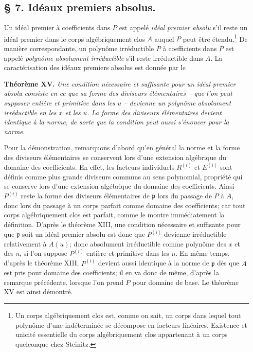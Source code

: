 \providecommand{\frakS}{\mathfrak S}
\providecommand{\frakm}{\mathfrak m}
\providecommand{\frakp}{\mathfrak p}

\subsection*{\S{} 7. Idéaux premiers absolus.}

Un idéal premier à coefficients dans $P$ est appelé \emph{idéal premier absolu} s'il reste un idéal premier dans le corps algébriquement clos $A$ auquel $P$ peut être étendu.\footnote{Un corps algébriquement clos est, comme on sait, un corps dans lequel tout polynôme d'une indéterminée se décompose en facteurs linéaires. Existence et unicité essentielle du corps algébriquement clos appartenant à un corps quelconque chez Steinitz.} De manière correspondante, un polynôme irréductible $P$ à coefficients dans $P$ est appelé \emph{polynôme absolument irréductible} s'il reste irréductible dans $A$. La caractérisation des idéaux premiers absolus est donnée par le

\textbf{Théorème XV.} \emph{Une condition nécessaire et suffisante pour un idéal premier absolu consiste en ce que sa forme des diviseurs élémentaires -- que l'on peut supposer entière et primitive dans les $u$ -- devienne un polynôme absolument irréductible en les $x$ et les $u$. La forme des diviseurs élémentaires devient identique à la norme, de sorte que la condition peut aussi s'énoncer pour la norme.}

Pour la démonstration, remarquons d'abord qu'en général la norme et la forme des diviseurs élémentaires se conservent lors d'une extension algébrique du domaine des coefficients. En effet, les facteurs individuels $R^{(i)}$ et $E^{(i)}$ sont définis comme plus grands diviseurs communs au sens polynomial, propriété qui se conserve lors d'une extension algébrique du domaine des coefficients. Ainsi $P^{(i)}$ reste la forme des diviseurs élémentaires de $\frakp$ lors du passage de $P$ à $A$, donc lors du passage à un corps parfait comme domaine des coefficients; car tout corps algébriquement clos est parfait, comme le montre immédiatement la définition. D'après le théorème XIII, une condition nécessaire et suffisante pour que $\frakp$ soit un idéal premier absolu est donc que $P^{(i)}$ devienne irréductible relativement à $A(u)$; donc absolument irréductible comme polynôme des $x$ et des $u$, si l'on suppose $P^{(i)}$ entière et primitive dans les $u$. En même temps, d'après le théorème XIII, $P^{(i)}$ devient aussi identique à la norme de $\frakp$ dès que $A$ est pris pour domaine des coefficients; il en va donc de même, d'après la remarque précédente, lorsque l'on prend $P$ pour domaine de base. Le théorème XV est ainsi démontré.

